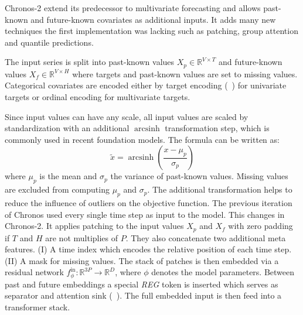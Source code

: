 Chronos-2 extend its predecessor to multivariate forecasting and allows past-known and future-known covariates as additional inputs. It adds many new techniques the first implementation was lacking such as patching, group attention and quantile predictions.

The input series is split into past-known values $X_{p} \in \mathbb{R}^{V \times T}$ and future-known values $X_{f} \in \mathbb{R}^{V \times H}$ where targets and past-known values are set to missing values. Categorical covariates are encoded either by target encoding (\citeauthor{preprocessingcategorical}~\cite{preprocessingcategorical}) for univariate targets or ordinal encoding for multivariate targets.

Since input values can have any scale, all input values are scaled by standardization with an additional $\operatorname{arcsinh}$ transformation step, which is commonly used in recent foundation models. The formula can be written as:
\begin{equation}
	\tilde{x} = \operatorname{arcsinh}\left(\dfrac{x - \mu_p}{\sigma_p} \right)
\end{equation}
where $\mu_p$ is the mean and $\sigma_p$ the variance of past-known values. Missing values are excluded from computing $\mu_p$ and $\sigma_p$.
The additional transformation helps to reduce the influence of outliers on the objective function. The previous iteration of Chronos used every single time step as input to the model. This changes in Chronos-2. It applies patching to the input values $X_{p}$ and $X_{f}$ with zero padding if $T$ and $H$ are not multiplies of $P$. They also concatenate two additional meta features. (I) A time index which encodes the relative position of each time step. (II) A mask for missing values. The stack of patches is then embedded via a residual network $f_{\phi}^{\text{in}}: \mathbb{R}^{3P} \to \mathbb{R}^D$, where $\phi$ denotes the model parameters. Between past and future embeddings a special \emph{REG} token is inserted which serves as separator and attention sink (\citeauthor{attentionsink}~\cite{attentionsink}). The full embedded input is then feed into a transformer stack.

